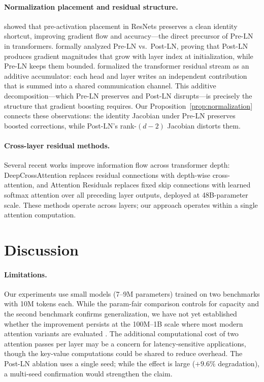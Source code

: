 \documentclass{article}
\theoremstyle{definition}
\begin{document}
\paragraph{Normalization placement and residual structure.}
\citet{he2016identity} showed that pre-activation placement in ResNets preserves a clean identity shortcut, improving gradient flow and accuracy---the direct precursor of Pre-LN in transformers.
\citet{xiong2020layer} formally analyzed Pre-LN vs.\ Post-LN, proving that Post-LN produces gradient magnitudes that grow with layer index at initialization, while Pre-LN keeps them bounded.
\citet{elhage2021mathematical} formalized the transformer residual stream as an additive accumulator: each head and layer writes an independent contribution that is summed into a shared communication channel.
This additive decomposition---which Pre-LN preserves and Post-LN disrupts---is precisely the structure that gradient boosting requires.
Our Proposition~\ref{prop:normalization} connects these observations: the identity Jacobian under Pre-LN preserves boosted corrections, while Post-LN's rank-$(d{-}2)$ Jacobian distorts them.

\paragraph{Cross-layer residual methods.}
Several recent works improve information flow across transformer depth: DeepCrossAttention \citep{heddes2025deepcrossattention} replaces residual connections with depth-wise cross-attention, and Attention Residuals \citep{kimi2026attnres} replaces fixed skip connections with learned softmax attention over all preceding layer outputs, deployed at 48B-parameter scale.
These methods operate across layers; our approach operates within a single attention computation.


\section{Discussion}
\label{sec:discussion}

\paragraph{Limitations.}
Our experiments use small models (7--9M parameters) trained on two benchmarks with 10M tokens each.
While the param-fair comparison controls for capacity and the second benchmark confirms generalization, we have not yet established whether the improvement persists at the 100M--1B scale where most modern attention variants are evaluated \citep{ye2025differential}.
The additional computational cost of two attention passes per layer may be a concern for latency-sensitive applications, though the key-value computations could be shared to reduce overhead.
The Post-LN ablation uses a single seed; while the effect is large ($+9.6\%$ degradation), a multi-seed confirmation would strengthen the claim.
\end{document}
